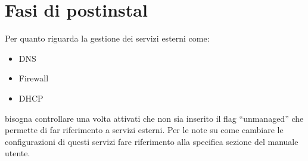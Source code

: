 
\section{Fasi di postinstal}

Per quanto riguarda la gestione dei servizi esterni come:

\begin{itemize}
\item DNS
\item Firewall
\item DHCP
\end{itemize}

bisogna controllare una volta attivati che non sia inserito il flag ``unmanaged'' che permette di far riferimento a servizi esterni.
Per le note su come cambiare le configurazioni di questi servizi fare riferimento alla specifica sezione del manuale utente.


